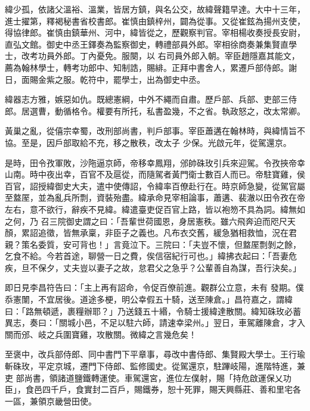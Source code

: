 \begin{pinyinscope}
 緯少孤，依諸父溫裕、溫業，皆居方鎮，與名公交，故緯聲籍早達。大中十三年，進士擢第，釋褐秘書省校書郎。崔慎由鎮梓州，闢為從事。又從崔鉉為揚州支使，得協律郎。崔慎由鎮華州、河中，緯皆從之，歷觀察判官。宰相楊收奏授長安尉，直弘文館。御史中丞王鐸奏為監察御史，轉禮部員外郎。宰相徐商奏兼集賢直學士，改考功員外郎。丁內憂免。服闋，以
 右司員外郎入朝。宰臣趙隱嘉其能文，薦為翰林學士，轉考功郎中、知制誥，賜緋。正拜中書舍人，累遷戶部侍郎。謝日，面賜金紫之服。乾符中，罷學士，出為御史中丞。



 緯器志方雅，嫉惡如仇。既總憲綱，中外不繩而自肅。歷戶部、兵部、吏部三侍郎。居選曹，動循格令。權要有所托，私書盈幾，不之省。執政怒之，改太常卿。



 黃巢之亂，從僖宗幸蜀，改刑部尚書，判戶部事。宰臣蕭遘在翰林時，與緯情旨不協。至是，因戶部取給不充，移之散秩，改太子
 少保。光啟元年，從駕還京。



 是時，田令孜軍敗，沙陁逼京師，帝移幸鳳翔，邠帥硃玫引兵來迎駕。令孜挾帝幸山南。時中夜出幸，百官不及扈從，而隨駕者黃門衛士數百人而已。帝駐寶雞，侯百官，詔授緯御史大夫，遣中使傳詔，令緯率百僚赴行在。時京師急變，從駕官屬至盩厔，並為亂兵所剽，資裝殆盡。緯承命見宰相論事，蕭遘、裴澈以田令孜在帝左右，意不欲行，辭疾不見緯。緯遣臺吏促百官上路，皆以袍笏不具為詞。緯無如之何，乃
 召三院御史謂之曰：「吾輩世荷國恩，身居憲秩。雖六飛奔迫而咫尺天顏，累詔追徵，皆無承稟，非臣子之義也。凡布衣交舊，緩急猶相救恤，況在君親？策名委質，安可背也！」言竟泣下。三院曰：「夫豈不懷，但盩厔剽剝之餘，乞食不給。今若首途，聊營一日之費，俟信宿紀行可也。」緯拂衣起曰：「吾妻危疾，旦不保夕，丈夫豈以妻子之故，怠君父之急乎？公輩善自為謀，吾行決矣。」



 即日見李昌符告曰：「主上再有詔命，令促百僚前進。觀群公立意，未有
 發期。僕忝憲闈，不宜居後。道途多梗，明公幸假五十騎，送至陳倉。」昌符嘉之，謂緯曰：「路無頓遞，裹糧辦耶？」乃送錢五十緡，令騎士援緯達散關。緯知硃玫必蓄異志，奏曰：「關城小邑，不足以駐六師，請速幸梁州。」翌日，車駕離陳倉，才入關而邠、岐之兵圍寶雞，攻散關。微緯之言幾危矣！



 至褒中，改兵部侍郎、同中書門下平章事，尋改中書侍郎、集賢殿大學士。王行瑜斬硃玫，平定京城，遷門下侍郎、監修國史。從駕還京，駐蹕岐陽，進階特進，兼吏
 部尚書，領諸道鹽鐵轉運使。車駕還宮，進位左僕射，賜「持危啟運保乂功臣」，食邑四千戶，食實封二百戶，賜鐵券，恕十死罪，賜天興縣莊、善和里宅各一區，兼領京畿營田使。




\end{pinyinscope}
